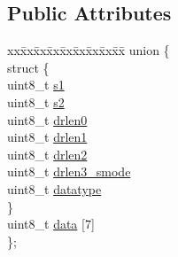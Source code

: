 \subsection*{Public Attributes}
\begin{DoxyCompactItemize}
\item 
\begin{tabbing}
xx\=xx\=xx\=xx\=xx\=xx\=xx\=xx\=xx\=\kill
union \{\\
\>struct \{\\
\>\>uint8\_t \hyperlink{structdescriptor__packet_a3187e2d5d736ad8ad2e5bfa39832851e}{s1}\\
\>\>uint8\_t \hyperlink{structdescriptor__packet_aecf654bc09c8021678564ef2938e9190}{s2}\\
\>\>uint8\_t \hyperlink{structdescriptor__packet_afaa19b5c2d3324b188e5f1b24a07c3fb}{drlen0}\\
\>\>uint8\_t \hyperlink{structdescriptor__packet_a3f182b48556355988a8f983fb9dc434b}{drlen1}\\
\>\>uint8\_t \hyperlink{structdescriptor__packet_ab3437c0152e4a97a832ce80da0075da6}{drlen2}\\
\>\>uint8\_t \hyperlink{structdescriptor__packet_afc7b12b3c81172ec5ebf5fe28413dcfd}{drlen3\_smode}\\
\>\>uint8\_t \hyperlink{structdescriptor__packet_ad1bea15d0f3741d718d82689884c787d}{datatype}\\
\>\} \\
\>uint8\_t \hyperlink{structdescriptor__packet_ad0ac7e3aa5ab78a411f748ae0baed2f3}{data} \mbox{[}7\mbox{]}\\
\}; \\

\end{tabbing}\end{DoxyCompactItemize}


